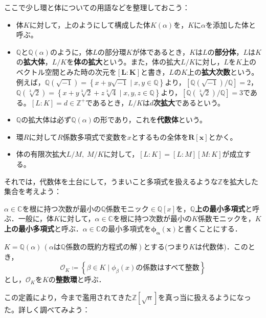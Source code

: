 ここで少し環と体についての用語などを整理しておこう：
\begin{itemize}
\item 体$K$に対して，上のようにして構成した体$K(\alpha)$を，$K$に$\alpha$を添加した体と呼ぶ。
\item $\mathbb{Q}$と$\mathbb{Q}(\alpha)$のように，体$L$の部分環$K$が体であるとき，$K$は$L$の\textbf{部分体}，$L$は$K$の\textbf{拡大体}，$L/K$を\textbf{体の拡大}という。また，体の拡大$L/K$に対し，$L$を$K$上のベクトル空間とみた時の次元を$\boldsymbol{[L:K]}$と書き，$L$の$K$上の\textbf{拡大次数}という。例えば，$\mathbb{Q}(\sqrt{-1})=\left\{x+y\sqrt{-1}\mid x,y\in\mathbb{Q}\right\}$より，$[\mathbb{Q}(\sqrt{-1})/{\mathbb{Q}}]=2$，$\mathbb{Q}(\sqrt[3]{2})=\left\{x+y\sqrt[3]{2}+z\sqrt[3]{4}\mid x,y,z\in\mathbb{Q}\right\}$より，$[\mathbb{Q}(\sqrt[3]{2})/{\mathbb{Q}}]=3$である。$[L:K]=d\in\mathbb{Z}^{+}$であるとき，$L/K$は\textbf{$d$次拡大}であるという。
\item $\mathbb{Q}$の拡大体は必ず$\mathbb{Q}(\alpha)$の形であり，これを\textbf{代数体}という。
\item 環$R$に対して$R$係数多項式で変数を$x$とするもの全体を$\boldsymbol{R[x]}$とかく。
\item 体の有限次拡大$L/M,\; M/K$に対して，$[L:K]=[L:M][M:K]$が成立する。
\end{itemize}

それでは，代数体を土台にして，うまいこと多項式を扱えるような$\mathbb{Z}$を拡大した集合を考えよう：

\begin{dfn}[最小多項式]
    $\alpha\in\mathbb{C}$を根に持つ次数が最小の$\mathbb{Q}$係数モニック$\in\mathbb{Q}[x]$を，\textbf{$\mathbb{Q}$上の最小多項式}と呼ぶ．一般に，体$K$に対して，$\alpha\in\mathbb{C}$を根に持つ次数が最小の$K$係数モニックを，\textbf{$K$上の最小多項式}と呼ぶ．$\alpha\in\mathbb{C}$の最小多項式を$\boldsymbol{\phi_{\alpha}(x)}$と書くことにする．
\end{dfn}

\begin{dfn}
    $K=\mathbb{Q}(\alpha)\, (\alpha\text{は}\mathbb{Q}\text{係数の既約方程式の解})$とする(つまり$K$は代数体)．このとき，\[
    \mathcal{O}_K\coloneqq \left\{\beta\in K\mid \phi_{\beta}(x)\text{の係数はすべて整数}\right\}
    \]とし，$\mathcal{O}_K$を$K$の\textbf{整数環}と呼ぶ．
\end{dfn}

この定義により，今まで濫用されてきた$\mathbb{Z}[\sqrt{n}]$を真っ当に扱えるようになった。詳しく調べてみよう：


